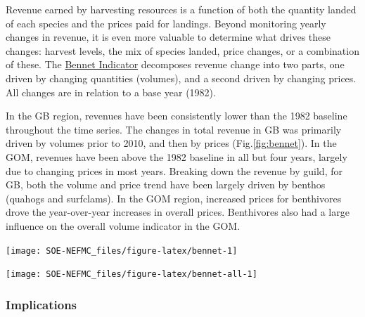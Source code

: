 \documentclass[
  10pt,
]{article}
\let\origfigure\figure
\let\endorigfigure\endfigure
\renewenvironment{figure}[1][2] {
    \expandafter\origfigure\expandafter[H]
} {
    \endorigfigure
}
\begin{document}
Revenue earned by harvesting resources is a function of both the quantity landed of each species and the prices paid for landings. Beyond monitoring yearly changes in revenue, it is even more valuable to determine what drives these changes: harvest levels, the mix of species landed, price changes, or a combination of these. The \href{https://noaa-edab.github.io/catalog/bennet-indicator.html}{Bennet Indicator} decomposes revenue change into two parts, one driven by changing quantities (volumes), and a second driven by changing prices. All changes are in relation to a base year (1982).

In the GB region, revenues have been consistently lower than the 1982 baseline throughout the time series. The changes in total revenue in GB was primarily driven by volumes prior to 2010, and then by prices (Fig.\ref{fig:bennet}). In the GOM, revenues have been above the 1982 baseline in all but four years, largely due to changing prices in most years. Breaking down the revenue by guild, for GB, both the volume and price trend have been largely driven by benthos (quahogs and surfclams). In the GOM region, increased prices for benthivores drove the year-over-year increases in overall prices. Benthivores also had a large influence on the overall volume indicator in the GOM.

\begin{figure}

{\centering \texttt{[image: SOE-NEFMC\_files/figure-latex/bennet-1]} 

}

\caption{Revenue change from the 1982 baseline in 2022 dollars (black), price, and volume for commercial landings from Georges Bank (GB: left) and the Gulf of Maine (GOM: right)}\label{fig:bennet}
\end{figure}
\begin{figure}

{\centering \texttt{[image: SOE-NEFMC\_files/figure-latex/bennet-all-1]} 

}

\caption{Revenue change from the long-term mean in 2022 dollars (black), price, and volume for commercial landings from Georges Bank (GB: top panels) and the Gulf of Maine (GOM: bottom panels)}\label{fig:bennet-all}
\end{figure}

\hypertarget{implications-1}{%
\subsubsection{Implications}\label{implications-1}}
\end{document}
